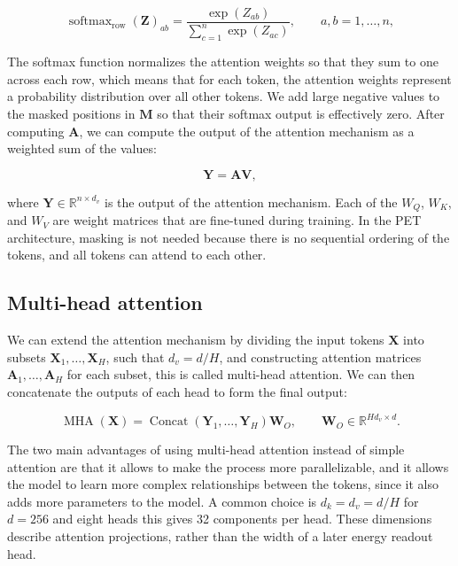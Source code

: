 \documentclass[12pt,a4paper]{article}
\numberwithin{equation}{section}
\begin{document}
\begin{equation}
  \operatorname{softmax}_{\mathrm{row}}(\bm Z)_{ab}
    =\frac{\exp(Z_{ab})}{\sum_{c=1}^n\exp(Z_{ac})},
  \qquad a,b=1,\ldots,n,
  \label{eq:transformer-softmax}
\end{equation}

The softmax function normalizes the attention weights so that they sum to one across each row,
which means that for each token, the attention weights represent a probability distribution over all other tokens.
We add large negative values to the masked positions in $\bm M$ so that their softmax output is effectively zero.
After computing $\bm A$, we can compute the output of the attention mechanism as a weighted sum of the values:

\begin{equation}
  \bm Y = \bm A\bm V,
  \label{eq:transformer-attention-output}
\end{equation}

where $\bm Y\in\mathbb R^{n\times d_v}$ is the output of the attention mechanism.
Each of the $W_Q$, $W_K$, and $W_V$ are weight matrices that are fine-tuned during training.
In the PET architecture, masking is not needed because there is no sequential ordering of the tokens, and all tokens can attend to each other.

\subsection{Multi-head attention}

We can extend the attention mechanism by dividing the input tokens $\bm X$
into subsets $\bm X_1, \ldots, \bm X_H$, such that $d_v = d/H$, and constructing attention matrices $\bm A_1, \ldots, \bm A_H$ for each subset,
this is called multi-head attention. We can then concatenate the outputs of each head to form the final output:

\begin{equation}
  \operatorname{MHA}(\bm X)
    =\operatorname{Concat}(\bm Y_1,\ldots,\bm Y_H)\bm W_O,
  \qquad \bm W_O\in\mathbb R^{Hd_v\times d}.
  \label{eq:transformer-multihead}
\end{equation}

The two main advantages of using multi-head attention instead of simple attention
are that it allows to make the process more parallelizable,
and it allows the model to learn more complex relationships between the tokens,
since it also adds more parameters to the model.
A common choice is $d_k=d_v=d/H$ for $d=256$ and eight heads this gives 32 components per
head. These dimensions describe attention projections, rather than the
width of a later energy readout head.
\end{document}

